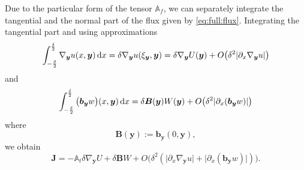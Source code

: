 \documentclass[a4paper]{article}
\def\prtl{\partial}
\def\vc#1{\mathbf{\boldsymbol{#1}}}     %
\def\tn#1{{\mathbb{#1}}}    %
\def\abs#1{\lvert#1\rvert}
\def\grad{\nabla}
\def\d {\,{\rm d}}
\begin{document}
Due to the particular form of the tensor $\tn A_f$, we can separately integrate the tangential and the normal
part of the flux given by \eqref{eq:full:flux}. Integrating the tangential part and using approximations
\[
    \int_{-\frac\delta2}^{\frac\delta2}  \grad_{\vc y} u(x, \vc y) \d x = \delta \grad_{\vc y} u (\xi_{\vc y}, \vc y) 
    = \delta \grad_{\vc y} U( \vc y) + O\big( \delta^2 \abs{\prtl_x\grad_{\vc y} u} \big) 
\]
and
\[
 \int_{-\frac\delta2}^{\frac\delta2} \big(\vc b_{\vc y} w\big)(x, \vc y) \d x 
  = \delta \vc B(\vc y) W(\vc y) + O\big(\delta^2 \abs{\prtl_x(\vc b_{\vc y} w)} \big)
\]
where
\[
  \vc B(\vc y) := \vc b_{\vc y}(0, \vc y),
\]
we obtain
\begin{equation}
    \label{eq:fracture_darcy}
   \vc J = -\tn A_t \delta \grad_{\vc y} U + \delta \vc B W + O\big(\delta^2(\abs{\prtl_x\grad_{\vc y} u}+\abs{\prtl_x(\vc b_{\vc y} w)})\big).
\end{equation}
\end{document}

